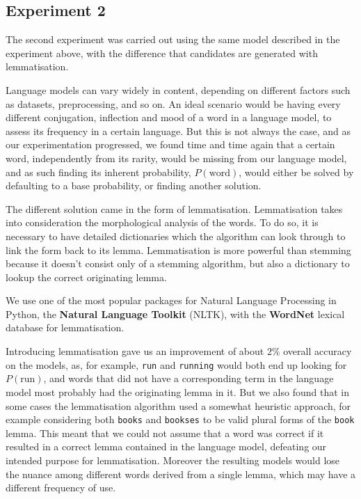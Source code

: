 \subsection{Experiment 2}
The second experiment was carried out using the same model described in the experiment above, with the 
difference that candidates are generated with lemmatisation.  

Language models can vary widely in content, depending on different factors such as datasets, preprocessing, and 
so on. An ideal scenario would be having every different conjugation, inflection and mood of a word in a language 
model, to assess its frequency in a certain language. But this is not always the case, and as our experimentation 
progressed, we found time and time again that a certain word, independently from its rarity, would be missing 
from our language model, and as such finding its inherent probability, $P(\mbox{word})$, would either be solved 
by defaulting to a base probability, or finding another solution.

The different solution came in the form of lemmatisation.
Lemmatisation takes into consideration the morphological analysis of the words. To do so, it is necessary to have 
detailed dictionaries which the algorithm can look through to link the form back to its lemma. Lemmatisation is 
more powerful than stemming because it doesn't consist only of a stemming algorithm, but also a dictionary to 
lookup the correct originating lemma.

We use one of the most popular packages for Natural Language Processing in Python, the \textbf{Natural 
Language Toolkit} (NLTK), with the \textbf{WordNet} lexical database for lemmatisation.

Introducing lemmatisation gave us an improvement of about $2\%$ overall accuracy on the models, as, for example, 
\texttt{run} and \texttt{running} would both end up looking for $P(\mbox{run})$, and words that did not have a 
corresponding term in the language model most probably had the originating lemma in it. But we also found that in some 
cases the lemmatisation algorithm used a somewhat heuristic approach, for example considering both \texttt{books} and 
\texttt{bookses} to be valid plural forms of the \texttt{book} lemma. This meant that we could not assume that a word 
was correct if it resulted in a correct lemma contained in the language model, defeating our intended purpose for 
lemmatisation. Moreover the resulting models would lose the nuance among different words derived from a single lemma, 
which may have a different frequency of use.

